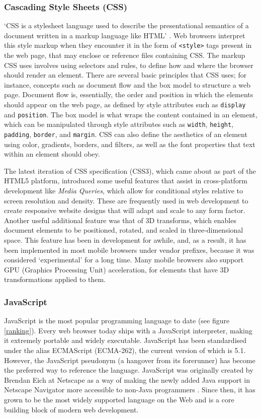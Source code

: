\documentclass[final]{cmpreport}
\begin{document}
\subsubsection{Cascading Style Sheets (CSS)}
`CSS is a stylesheet language used to describe the presentational semantics of a document written in a markup language like HTML' \citep{Neilson}. Web browsers interpret this style markup when they encounter it in the form of \texttt{<style>} tags present in the web page, that may enclose or reference files containing CSS. The markup CSS uses involves using selectors and rules, to define how and where the browser should render an element. There are several basic principles that CSS uses; for instance, concepts such as document flow and the box model to structure a web page. Document flow is, essentially, the order and position in which the elements should appear on the web page, as defined by style attributes such as \texttt{display} and \texttt{position}. The box model is what wraps the content contained in an element, which can be manipulated through style attributes such as \texttt{width}, \texttt{height}, \texttt{padding}, \texttt{border}, and \texttt{margin}. CSS can also define the aesthetics of an element using color, gradients, borders, and filters, as well as the font properties that text within an element should obey.

The latest iteration of CSS specification (CSS3), which came about as part of the HTML5 platform, introduced some useful features that assist in cross-platform development like \textit{Media Queries}, which allow for conditional styles relative to screen resolution and density. These are  frequently used in web development to create responsive website designs that will adapt and scale to any form factor. Another useful additional feature was that of 3D transforms,  which enables document elements to be positioned, rotated, and scaled in three-dimensional space. This feature has been in development for awhile, and, as a result, it has been implemented in most mobile browsers under vendor prefixes, because it was considered `experimental' for a long time. Many mobile browsers also support GPU (Graphics Processing Unit) acceleration, for elements that have 3D transformations applied to them.

\subsubsection{JavaScript}
JavaScript is the most popular programming language to date (see figure \ref{ranking}). Every web browser today ships with a JavaScript interpreter, making it extremely portable and widely executable. JavaScript has been standardised under the alias ECMAScript (ECMA-262), the current version of which is 5.1\footnotemark[6]. However, the JavaScript pseudonym (a hangover from its forerunner) has become the preferred way to reference the language. JavaScript was originally created by Brendan Eich at Netscape as a way of making the newly added Java support in Netscape Navigator more accessible to non-Java programmers \citep{Champeon}. Since then, it has grown to be the most widely supported  language on the Web and is a core building block of modern web development.
\end{document}
